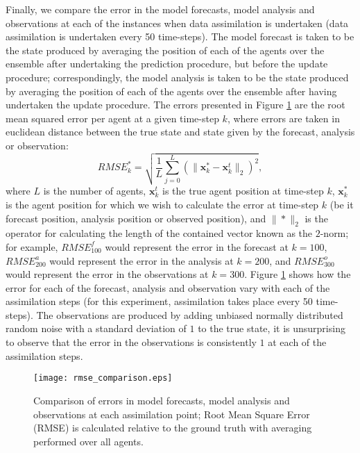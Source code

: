 Finally, we compare the error in the model forecasts, model analysis and
observations at each of the instances when data assimilation is undertaken (data
assimilation is undertaken every 50 time-steps).
The model forecast is taken to be the state produced by averaging the position
of each of the agents over the ensemble after undertaking the prediction
procedure, but before the update procedure; correspondingly, the model analysis
is taken to be the state produced by averaging the position of each of the
agents over the ensemble after having undertaken the update procedure.
The errors presented in Figure \ref{fig:rmse_comparison} are the root mean
squared error per agent at a given time-step $k$, where errors are taken in
euclidean distance between the true state and state given by the forecast,
analysis or observation:
\begin{equation}
    RMSE_{k}^{*} = \sqrt{\frac{1}{L} \sum_{j=0}^{L}
                    \left(
                    \| \mathbf{x}_{k}^{*} - \mathbf{x}_{k}^{t} \|_{2}
                    \right) ^ 2},
\end{equation}
where $L$ is the number of agents, $\mathbf{x}_{k}^t$ is the true agent position
at time-step $k$, $\mathbf{x}_{k}^{*}$ is the agent position for which we wish
to calculate the error at time-step $k$ (be it forecast position, analysis
position or observed position), and $\| * \|_2$ is the operator for calculating
the length of the contained vector known as the $2$-norm; for example,
$RMSE_{100}^{f}$ would represent the error in the forecast at $k=100$,
$RMSE_{200}^{a}$ would represent the error in the analysis at $k=200$, and
$RMSE_{300}^{o}$ would represent the error in the observations at $k=300$.
Figure \ref{fig:rmse_comparison} shows how the error for each of the forecast,
analysis and observation vary with each of the assimilation steps (for this
experiment, assimilation takes place every 50 time-steps).
The observations are produced by adding unbiased normally distributed random
noise with a standard deviation of $1$ to the true state, it is unsurprising to
observe that the error in the observations is consistently $1$ at each of the
assimilation steps.

\begin{figure}[h]
    \centering
    \texttt{[image: rmse\_comparison.eps]}
    \caption[Comparison of errors in model forecasts, model analysis and
    observations at each assimilation point.]{\centering Comparison of errors in
    model forecasts, model analysis and observations at each assimilation point;
    Root Mean Square Error (RMSE) is calculated relative to the ground truth
    with averaging performed over all agents.}\label{fig:rmse_comparison}
\end{figure}

